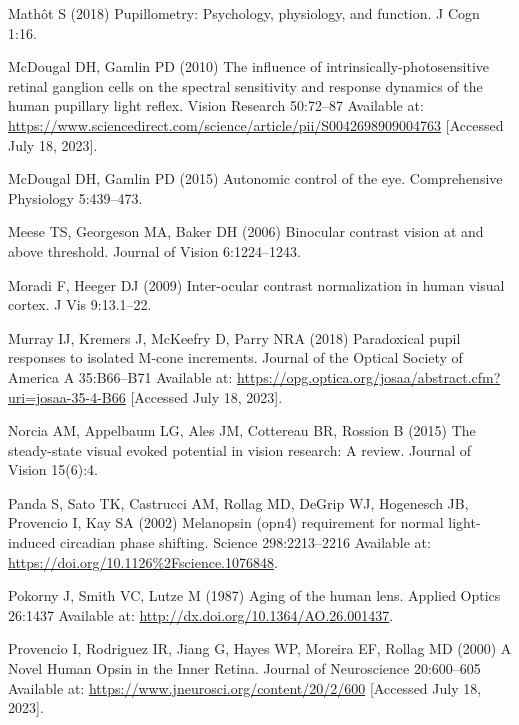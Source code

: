 \documentclass[
]{article}
\begin{document}
\leavevmode\hypertarget{ref-Mathot2018}{}%
Mathôt S (2018) Pupillometry: Psychology, physiology, and function. J Cogn 1:16.

\leavevmode\hypertarget{ref-McDougal2010}{}%
McDougal DH, Gamlin PD (2010) The influence of intrinsically-photosensitive retinal ganglion cells on the spectral sensitivity and response dynamics of the human pupillary light reflex. Vision Research 50:72--87 Available at: \url{https://www.sciencedirect.com/science/article/pii/S0042698909004763} {[}Accessed July 18, 2023{]}.

\leavevmode\hypertarget{ref-McDougal2015}{}%
McDougal DH, Gamlin PD (2015) Autonomic control of the eye. Comprehensive Physiology 5:439--473.

\leavevmode\hypertarget{ref-Meese2006}{}%
Meese TS, Georgeson MA, Baker DH (2006) Binocular contrast vision at and above threshold. Journal of Vision 6:1224--1243.

\leavevmode\hypertarget{ref-Moradi2009}{}%
Moradi F, Heeger DJ (2009) Inter-ocular contrast normalization in human visual cortex. J Vis 9:13.1--22.

\leavevmode\hypertarget{ref-Murray2018}{}%
Murray IJ, Kremers J, McKeefry D, Parry NRA (2018) Paradoxical pupil responses to isolated M-cone increments. Journal of the Optical Society of America A 35:B66--B71 Available at: \url{https://opg.optica.org/josaa/abstract.cfm?uri=josaa-35-4-B66} {[}Accessed July 18, 2023{]}.

\leavevmode\hypertarget{ref-Norcia2015}{}%
Norcia AM, Appelbaum LG, Ales JM, Cottereau BR, Rossion B (2015) The steady-state visual evoked potential in vision research: A review. Journal of Vision 15(6):4.

\leavevmode\hypertarget{ref-Panda2002}{}%
Panda S, Sato TK, Castrucci AM, Rollag MD, DeGrip WJ, Hogenesch JB, Provencio I, Kay SA (2002) Melanopsin (opn4) requirement for normal light-induced circadian phase shifting. Science 298:2213--2216 Available at: \url{https://doi.org/10.1126\%2Fscience.1076848}.

\leavevmode\hypertarget{ref-Pokorny1987}{}%
Pokorny J, Smith VC, Lutze M (1987) Aging of the human lens. Applied Optics 26:1437 Available at: \url{http://dx.doi.org/10.1364/AO.26.001437}.

\leavevmode\hypertarget{ref-Provencio2000}{}%
Provencio I, Rodriguez IR, Jiang G, Hayes WP, Moreira EF, Rollag MD (2000) A Novel Human Opsin in the Inner Retina. Journal of Neuroscience 20:600--605 Available at: \url{https://www.jneurosci.org/content/20/2/600} {[}Accessed July 18, 2023{]}.
\end{document}
